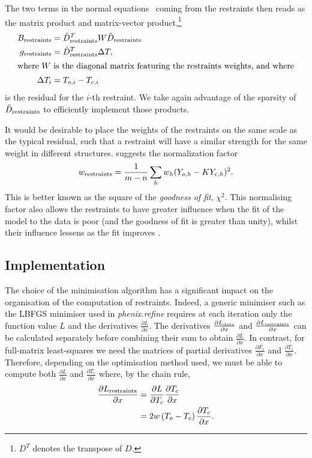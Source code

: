 \documentclass[pdf]{iucr}
\newcommand{\partialder}[2]{\frac{\partial #1}{\partial #2}}
\begin{document}
The two terms in the normal equations~ coming from the restraints then reads as the matrix product and matrix-vector product,\footnote{$D^T$ denotes the transpose of $D$.}
\begin{align}
B_{\text{restraints}} &= \tilde{D}_{\text{restraints}}^T W \tilde{D}_{\text{restraints}}\\
g_{\text{restraints}} &= \tilde{D}_{\text{restraints}}^T \Delta T,\\
\shortintertext{where $W$ is the diagonal matrix featuring the restraints weights, and where}
\Delta T_i &= T_{o,i} - T_{c,i}
\end{align}
is the residual for the $i$-th restraint. We take again advantage of the sparsity of $\tilde{D}_{\text{restraints}}$ to efficiently implement those products.

It would be desirable to place the weights of the restraints on the same scale as the typical residual, such that a restraint will have a similar strength for the same weight in different structures.  suggests the normalization factor
\begin{align}
w_{\text{restraints}} = \frac{1}{m-n} \sum_{h}{ w_h (Y_{o,h} - K Y_{c,h})^2}.
\label{eqn:giacovazzo_normalisation}
\end{align}
This is better known as the square of the \emph{goodness of fit}, $\chi^2$. This normalising factor also allows the restraints to have greater influence when the fit of the model to the data is poor (and the goodness of fit is greater than unity), whilst their influence lessens as the fit improves .

\subsection{Implementation}

The choice of the minimisation algorithm has a significant impact on the organisation of the computation of restraints. Indeed, a generic minimiser such as the LBFGS minimiser used in \emph{phenix.refine}  requires at each iteration only the function value $L$ and the derivatives $\partialder{L}{x}$. The derivatives $\partialder{L_\data}{x}$ and $\partialder{L_\restraints}{x}$ can be calculated separately before combining their sum to obtain $\partialder{L}{x}$. In contrast, for full-matrix least-squares we need the matrices of partial derivatives $\partialder{F_c}{x}$ and $\partialder{T_c}{x}$. Therefore, depending on the optimisation method used, we must be able to compute both $\partialder{L}{x}$ and $\partialder{T_c}{x}$ where, by the chain rule,
\begin{align}
\partialder{L_\restraints}{x} &= \partialder{L}{T_c} \partialder{T_c}{x} \nonumber\\
                             &= 2 w \left(T_o - T_c \right) \partialder{T_c}{x}.
\end{align}
\end{document}
